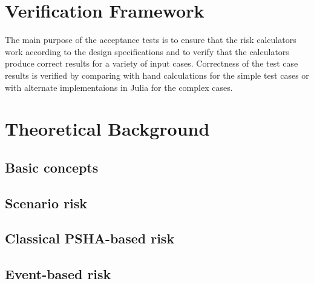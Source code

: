 \section{Verification Framework}
The main purpose of the acceptance tests is to ensure that the risk calculators work according to the design specifications and to verify that the calculators produce correct results for a variety of input cases. Correctness of the test case results is verified by comparing with hand calculations for the simple test cases or with alternate implementaions in Julia for the complex cases.

\section{Theoretical Background}
\subsection{Basic concepts}
   \label{subsec:theory-basic-concepts}
   
\subsection{Scenario risk}
   \label{subsec:theory-scenario-loss}
   
\subsection{Classical PSHA-based risk}
   \label{subsec:theory-classical}
   
\subsection{Event-based risk}
   \label{subsec:theory-eventbased}
   
   \cleardoublepage